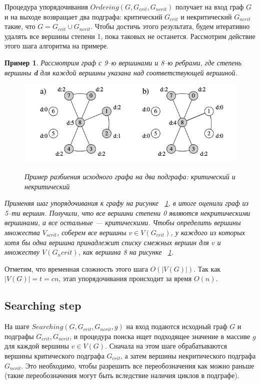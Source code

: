 \documentclass[specialist,
               substylefile = spbu.rtx,
               subf,href,colorlinks=true, 12pt]{disser}
\newtheorem{myexample}{Пример}
\begin{document}
Процедура упорядочивания $Ordering (G, G_{crit}, G_{ncrit})$ получает на вход граф $G$ и на выходе возвращает два подграфа: критический $G_{crit}$ и некритический $G_{ncrit}$ такие, что $G = G_{crit} \cup G_{ncrit}$. Чтобы достичь этого результата, будем итеративно удалять все вершины степени 1, пока таковых не останется. Рассмотрим действие этого шага алгоритма на примере.

\begin{myexample}
Рассмотрим граф с 9--ю вершинами и 8--ю ребрами, где степень вершины \textbf{d} для каждой вершины указана над соответствующей вершиной.

\begin{figure}[h]
\begin{center}
\includegraphics[scale=0.5]{imgs/ex2.jpg}\label{im:ex2}
\caption{Пример разбиения исходного графа на два подграфа: критический и некритический}
\end{center}
\end{figure}

Применяя шаг упорядочивания к графу на рисунке ~\ref{im:ex2}, в итоге оценили граф из 5--ти вершин. Получили, что все вершини степени 0 являются некритическими вершинами, а все остальные --- критическими. Чтобы определить вершины множества $V_{scrit}$, соберем все вершины $v \in V(G_{crit})$, у каждого из которых хотя бы одна вершина принадлежит списку смежных вершин для $v$ и множеству $V(G_ncrit)$, как вершина 8 на рисунке ~\ref{im:ex2}.
\end{myexample}

Отметим, что временная сложность этого шага $\mathit{O}(|V(G)|)$. Так как $|V(G)| = t = cn$, этап упорядочивания происходит за время $\mathit{O}(n)$.

\newpage

\subsection{Searching step}

На шаге $Searching (G, G_{crit}, G_{ncrit}, g)$ на вход подаются исходный граф $G$ и подграфы $G_{crit}, G_{ncrit}$, и процедура поиска ищет подходящее значение в массиве $g$ для каждой вершины $v \in V(G)$. Сначала на этом шаге обрабатываются вершины критического подграфа $G_{crit}$, а затем вершины некритического подграфа $G_{ncrit}$. Это необходимо, чтобы разрешить все переобозначения как можно раньше (такие переобозначения могут быть вследствие наличия циклов в подграфе).
\end{document}

